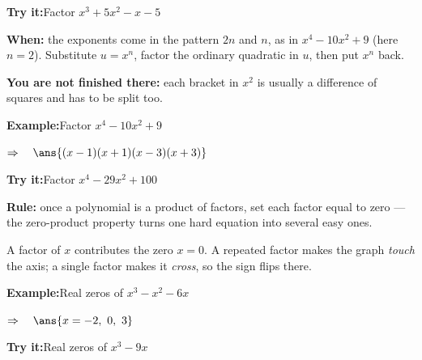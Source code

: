 \documentclass[12pt]{article}
\begin{document}
\begin{tryitbox}
\textbf{Try it:}\quad Factor $x^3 + 5x^2 - x - 5$\\[2pt]
\end{tryitbox}


\begin{formulabox}
\textbf{When:} the exponents come in the pattern $2n$ and $n$, as in
$x^4 - 10x^2 + 9$ (here $n = 2$). Substitute $u = x^n$, factor the ordinary
quadratic in $u$, then put $x^n$ back.\par
\textbf{You are not finished there:} each bracket in $x^2$ is usually a difference
of squares and has to be split too.
\end{formulabox}

\begin{examplebox}
\textbf{Example:}\quad Factor $x^4 - 10x^2 + 9$

$\Rightarrow\quad \ans{(x-1)(x+1)(x-3)(x+3)}$

\end{examplebox}

\begin{tryitbox}
\textbf{Try it:}\quad Factor $x^4 - 29x^2 + 100$\\[2pt]
\end{tryitbox}


\begin{formulabox}
\textbf{Rule:} once a polynomial is a product of factors, set each factor equal to
zero --- the zero-product property turns one hard equation into several easy ones.\par
A factor of $x$ contributes the zero $x = 0$. A repeated factor makes the graph
\emph{touch} the axis; a single factor makes it \emph{cross}, so the sign flips there.
\end{formulabox}

\begin{examplebox}
\textbf{Example:}\quad Real zeros of $x^3 - x^2 - 6x$

$\Rightarrow\quad \ans{x = -2,\ 0,\ 3}$

\end{examplebox}

\begin{tryitbox}
\textbf{Try it:}\quad Real zeros of $x^3 - 9x$\\[2pt]
\end{tryitbox}
\end{document}
